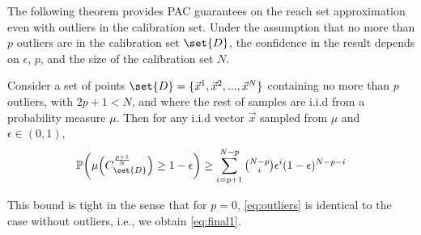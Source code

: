 \documentclass[pmlr]{jmlr}%
\begin{document}
The following theorem provides PAC guarantees on the reach set approximation even with outliers in the calibration set.
Under the assumption that no more than $p$ outliers are in the calibration set $\set{D}$, the confidence in the result depends on $\epsilon$, $p$, and the size of the calibration set $N$. 
%
%
\begin{theorem}\label{thm:conformal outliers}
Consider a set of points $\set{D} = \{ \Vec{x}^1 ,\Vec{x}^2,...,\Vec{x}^N  \}$ containing no more than $p$ outliers, with $2p +1 < N$, and where the rest of samples are i.i.d from a probability measure $\mu$. Then for any i.i.d vector $\Vec{x}$ sampled from $\mu$ and $\epsilon \in (0,1)$,
\begin{equation}\label{eq:outliers}
    \mathbb{P}\biggl( \mu\Bigl(C_{\set{D}}^{\frac{p+1}{N}}\Bigr)  \geq 1-\epsilon \biggr) \geq \sum_{i = p+1}^{N-p} \tbinom{N-p}{i} \epsilon^i (1-\epsilon)^{N-p-i}
\end{equation}
\end{theorem}
%
This bound is tight in the sense that for $p=0$, \eqref{eq:outliers} is identical to the case without outliers, i.e., we obtain \eqref{eq:final1}.
%
\end{document}
